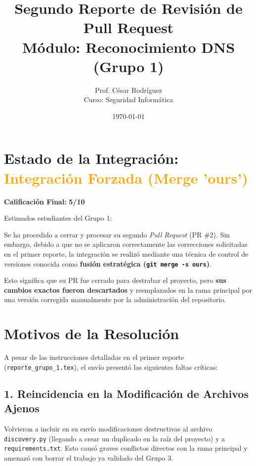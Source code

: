 \documentclass[12pt,a4paper]{article}
\title{Segundo Reporte de Revisión de Pull Request \\ \large Módulo: Reconocimiento DNS (Grupo 1)}
\author{Prof. César Rodríguez \\ \small Curso: Seguridad Informática}
\date{\today}
\begin{document}
\maketitle

\section*{Estado de la Integración: \textcolor{orange}{Integración Forzada (Merge 'ours')}}

\noindent \textbf{Calificación Final:} \textbf{5/10}

\vspace{0.5cm}
Estimados estudiantes del Grupo 1:

Se ha procedido a cerrar y procesar su segundo \textit{Pull Request} (PR \#2). Sin embargo, debido a que no se aplicaron correctamente las correcciones solicitadas en el primer reporte, la integración se realizó mediante una técnica de control de versiones conocida como \textbf{fusión estratégica (\texttt{git merge -s ours})}. 

Esto significa que su PR fue cerrado para destrabar el proyecto, pero \textbf{sus cambios exactos fueron descartados} y reemplazados en la rama principal por una versión corregida manualmente por la administración del repositorio.

\section*{Motivos de la Resolución}

A pesar de las instrucciones detalladas en el primer reporte (\texttt{reporte\_grupo\_1.tex}), el envío presentó las siguientes faltas críticas:

\subsection*{1. Reincidencia en la Modificación de Archivos Ajenos}
Volvieron a incluir en su envío modificaciones destructivas al archivo \texttt{discovery.py} (llegando a crear un duplicado en la raíz del proyecto) y a \texttt{requirements.txt}. Esto causó graves conflictos directos con la rama principal y amenazó con borrar el trabajo ya validado del Grupo 3.
\end{document}

